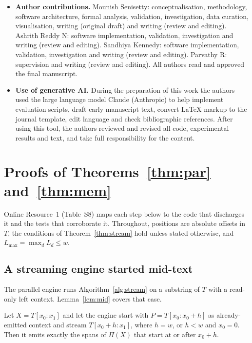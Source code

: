 \documentclass[pdflatex,sn-mathphys-num]{sn-jnl}
\theoremstyle{\ssThmStyle}
\theoremstyle{\ssDefStyle}
\begin{document}
\begin{itemize}
\ifanonymous\else
\item \textbf{Author contributions.} Mounish Senisetty: conceptualisation, methodology, software architecture, formal analysis, validation, investigation, data curation, visualisation, writing (original draft) and writing (review and editing). Ashrith Reddy N: software implementation, validation, investigation and writing (review and editing). Sandhiya Kennedy: software implementation, validation, investigation and writing (review and editing). Parvathy R: supervision and writing (review and editing). All authors read and approved the final manuscript.
\fi
\item \textbf{Use of generative AI.} During the preparation of this work the authors used the large language model Claude (Anthropic) to help implement evaluation scripts, draft early manuscript text, convert \LaTeX{} markup to the journal template, edit language and check bibliographic references. After using this tool, the authors reviewed and revised all code, experimental results and text, and take full responsibility for the content.
\end{itemize}

\appendix
\section{Proofs of Theorems~\ref{thm:par} and~\ref{thm:mem}}\label{app:proofs}

Online Resource~1 (Table~S8) maps each step below to the code that discharges it and the tests that corroborate it. Throughout, positions are absolute offsets in $T$, the conditions of Theorem~\ref{thm:stream} hold unless stated otherwise, and $L_{\max} = \max_d L_d \le w$.

\subsection{A streaming engine started mid-text}

The parallel engine runs Algorithm~\ref{alg:stream} on a substring of $T$ with a read-only left context. Lemma~\ref{lem:mid} covers that case.

\begin{lemma}\label{lem:mid}
Let $X = T[x_0{:}x_1]$ and let the engine start with $P = T[x_0{:}x_0 + h]$ as already-emitted context and stream $T[x_0 + h : x_1]$, where $h = w$, or $h < w$ and $x_0 = 0$. Then it emits exactly the spans of $\Pi(X)$ that start at or after $x_0 + h$.
\end{lemma}
\end{document}
